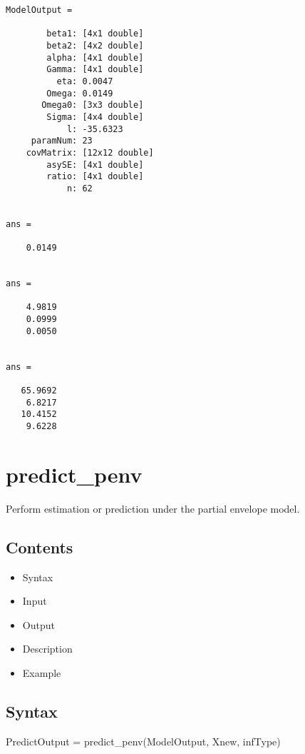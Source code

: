 \documentclass[a4paper,11pt,openany]{memoir}
\begin{document}
        \color{lightgray}\ttfamily \begin{verbatim}
ModelOutput = 

        beta1: [4x1 double]
        beta2: [4x2 double]
        alpha: [4x1 double]
        Gamma: [4x1 double]
          eta: 0.0047
        Omega: 0.0149
       Omega0: [3x3 double]
        Sigma: [4x4 double]
            l: -35.6323
     paramNum: 23
    covMatrix: [12x12 double]
        asySE: [4x1 double]
        ratio: [4x1 double]
            n: 62


ans =

    0.0149


ans =

    4.9819
    0.0999
    0.0050


ans =

   65.9692
    6.8217
   10.4152
    9.6228

\end{verbatim} \rmfamily
\color{black}

\newpage

\rmfamily
\color{black}\section{predict\_penv}

\begin{par}
Perform estimation or prediction under the partial envelope model.
\end{par} \vspace{1em}

\subsection*{Contents}

\begin{itemize}
\setlength{\itemsep}{-1ex}
   \item Syntax
   \item Input
   \item Output
   \item Description
   \item Example
\end{itemize}


\subsection*{Syntax}

\begin{par}
PredictOutput = predict\_penv(ModelOutput, Xnew, infType)
\end{par} \vspace{1em}
\end{document}
